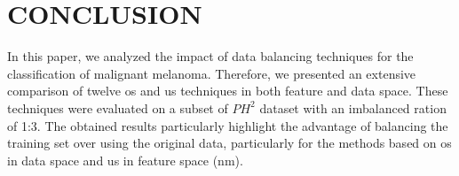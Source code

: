\graphicspath{ {./content/Experiments-results/figures/} }

\section{\uppercase{Conclusion}}
\label{sec:cons} 

\noindent In this paper, we analyzed the impact of data balancing techniques for the classification of malignant melanoma. 
Therefore, we presented an extensive comparison of twelve \ac{os} and \ac{us} techniques in both feature and data space. 
These techniques were evaluated on a subset of $PH^{2}$ dataset with an imbalanced ration of 1:3. 
The obtained results particularly highlight the advantage of balancing the training set over using the original data, particularly for the methods based on \ac{os} in data space and \ac{us} in feature space (\ac{nm}).



